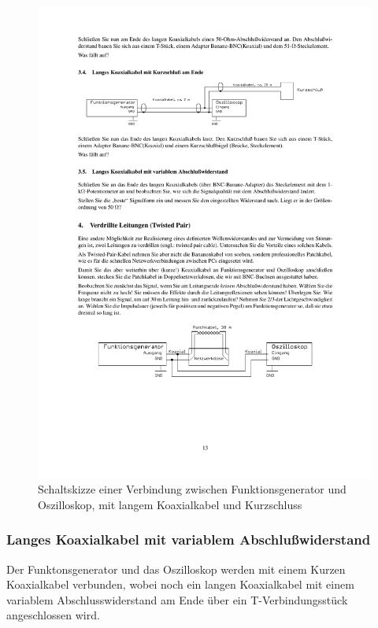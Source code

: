 \documentclass[12pt,a4paper]{article}
\begin{document}
\begin{figure}[H] 
  \centering
    \includegraphics[trim = 10mm 220mm 10mm 45mm, clip, scale = 1]{3_4-4.pdf}
  	\caption[Schaltskizze einer Verbindung zwischen Funktionsgenerator und Oszilloskop, mit langem Koaxialkabel und Kurzschluss]{Schaltskizze einer Verbindung zwischen Funktionsgenerator und Oszilloskop, mit langem Koaxialkabel und Kurzschluss\footnotemark}
  \label{fig:3.4}
\end{figure}

\subsubsection{Langes Koaxialkabel mit variablem Abschlußwiderstand}

Der Funktonsgenerator und das Oszilloskop werden mit einem Kurzen Koaxialkabel verbunden, wobei noch ein langen Koaxialkabel mit einem variablem Abschlusswiderstand am Ende über ein T-Verbindungsstück angeschlossen wird.
\end{document}
